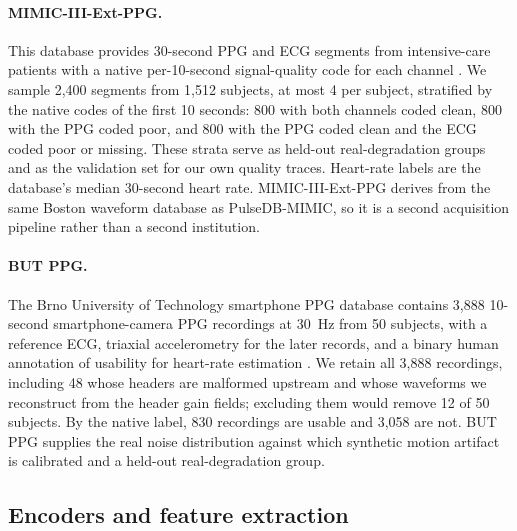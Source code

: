 \documentclass[pmlr,twocolumn,10pt]{jmlr}
\begin{document}
\paragraph{MIMIC-III-Ext-PPG.}
This database provides 30-second PPG and ECG segments from intensive-care patients with a native per-10-second signal-quality code for each channel \citep{mimicextppg}. We sample 2,400 segments from 1,512 subjects, at most 4 per subject, stratified by the native codes of the first 10 seconds: 800 with both channels coded clean, 800 with the PPG coded poor, and 800 with the PPG coded clean and the ECG coded poor or missing. These strata serve as held-out real-degradation groups and as the validation set for our own quality traces. Heart-rate labels are the database's median 30-second heart rate. MIMIC-III-Ext-PPG derives from the same Boston waveform database as PulseDB-MIMIC, so it is a second acquisition pipeline rather than a second institution.

\paragraph{BUT PPG.}
The Brno University of Technology smartphone PPG database contains 3,888 10-second smartphone-camera PPG recordings at \SI{30}{\hertz} from 50 subjects, with a reference ECG, triaxial accelerometry for the later records, and a binary human annotation of usability for heart-rate estimation \citep{nemcova2021butppg}. We retain all 3,888 recordings, including 48 whose headers are malformed upstream and whose waveforms we reconstruct from the header gain fields; excluding them would remove 12 of 50 subjects. By the native label, 830 recordings are usable and 3,058 are not. BUT PPG supplies the real noise distribution against which synthetic motion artifact is calibrated and a held-out real-degradation group.

\subsection{Encoders and feature extraction}
\label{sec:models}
\end{document}
